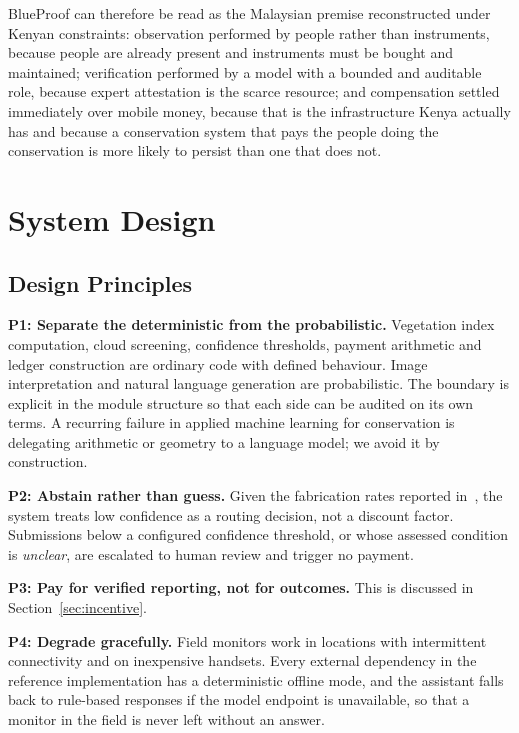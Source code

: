 \documentclass[10pt,twocolumn,a4paper]{article}
\begin{document}
BlueProof can therefore be read as the Malaysian premise reconstructed under
Kenyan constraints: observation performed by people rather than instruments,
because people are already present and instruments must be bought and
maintained; verification performed by a model with a bounded and auditable role,
because expert attestation is the scarce resource; and compensation settled
immediately over mobile money, because that is the infrastructure Kenya actually
has and because a conservation system that pays the people doing the
conservation is more likely to persist than one that does not.

\section{System Design}

\subsection{Design Principles}

\textbf{P1: Separate the deterministic from the probabilistic.} Vegetation
index computation, cloud screening, confidence thresholds, payment arithmetic
and ledger construction are ordinary code with defined behaviour. Image
interpretation and natural language generation are probabilistic. The boundary
is explicit in the module structure so that each side can be audited on its own
terms. A recurring failure in applied machine learning for conservation is
delegating arithmetic or geometry to a language model; we avoid it by
construction.

\textbf{P2: Abstain rather than guess.} Given the fabrication rates reported
in~\cite{zhou2026}, the system treats low confidence as a routing decision, not
a discount factor. Submissions below a configured confidence threshold, or
whose assessed condition is \emph{unclear}, are escalated to human review and
trigger no payment.

\textbf{P3: Pay for verified reporting, not for outcomes.} This is discussed in
Section~\ref{sec:incentive}.

\textbf{P4: Degrade gracefully.} Field monitors work in locations with
intermittent connectivity and on inexpensive handsets. Every external dependency
in the reference implementation has a deterministic offline mode, and the
assistant falls back to rule-based responses if the model endpoint is
unavailable, so that a monitor in the field is never left without an answer.
\end{document}
